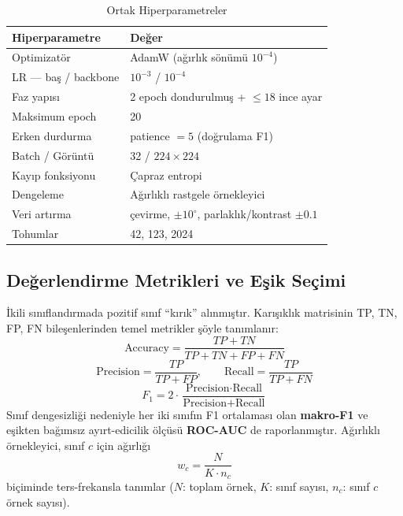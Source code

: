 \documentclass[conference]{IEEEtran}
\begin{document}
\begin{table}[t]
\caption{Ortak Hiperparametreler}
\label{tab:hyper}
\centering
\begin{tabular}{ll}
\toprule
\textbf{Hiperparametre} & \textbf{Değer} \\
\midrule
Optimizatör & AdamW (ağırlık sönümü $10^{-4}$) \cite{adamw} \\
LR --- baş / backbone & $10^{-3}$ / $10^{-4}$ \\
Faz yapısı & 2 epoch dondurulmuş + $\le 18$ ince ayar \\
Maksimum epoch & 20 \\
Erken durdurma & patience $= 5$ (doğrulama F1) \\
Batch / Görüntü & 32 / $224 \times 224$ \\
Kayıp fonksiyonu & Çapraz entropi \\
Dengeleme & Ağırlıklı rastgele örnekleyici \\
Veri artırma & çevirme, $\pm 10^{\circ}$, parlaklık/kontrast $\pm 0.1$ \\
Tohumlar & 42, 123, 2024 \\
\bottomrule
\end{tabular}
\end{table}

\subsection{Değerlendirme Metrikleri ve Eşik Seçimi}
İkili sınıflandırmada pozitif sınıf ``kırık'' alınmıştır. Karışıklık matrisinin TP, TN, FP, FN bileşenlerinden temel metrikler şöyle tanımlanır:
\begin{equation}
\text{Accuracy} = \frac{TP + TN}{TP + TN + FP + FN}
\end{equation}
\begin{equation}
\text{Precision} = \frac{TP}{TP + FP}, \qquad \text{Recall} = \frac{TP}{TP + FN}
\end{equation}
\begin{equation}
F_1 = 2 \cdot \frac{\text{Precision} \cdot \text{Recall}}{\text{Precision} + \text{Recall}}
\end{equation}
Sınıf dengesizliği nedeniyle her iki sınıfın F1 ortalaması olan \textbf{makro-F1} ve eşikten bağımsız ayırt-edicilik ölçüsü \textbf{ROC-AUC} de raporlanmıştır. Ağırlıklı örnekleyici, sınıf $c$ için ağırlığı
\begin{equation}
w_c = \frac{N}{K \cdot n_c}
\end{equation}
biçiminde ters-frekansla tanımlar ($N$: toplam örnek, $K$: sınıf sayısı, $n_c$: sınıf $c$ örnek sayısı).
\end{document}

